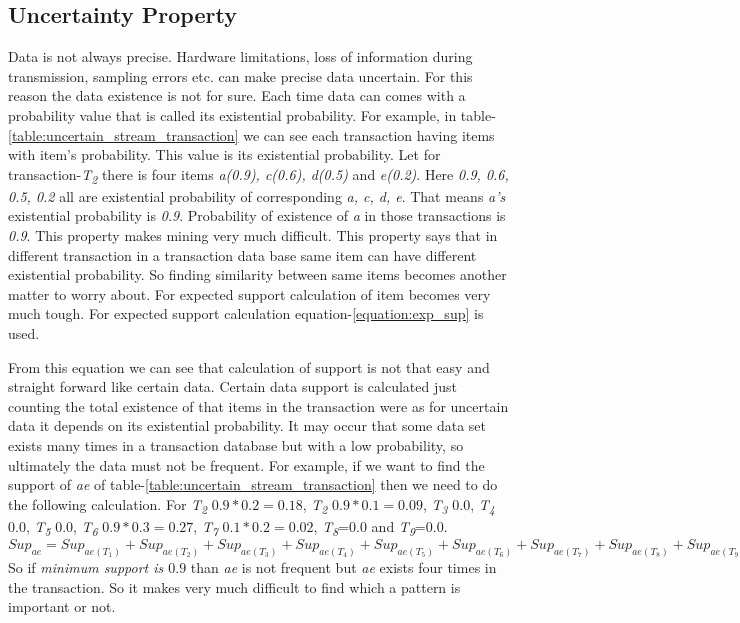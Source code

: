     \subsection{Uncertainty Property}
    Data is not always precise. Hardware limitations, loss of information during transmission, sampling errors etc. can make precise data uncertain. For this reason the data existence is not for sure. Each time data can comes with a probability value that is called its existential probability. For example, in table-\ref{table:uncertain_stream_transaction}  we can see each transaction having items with item's probability. This value is its existential probability. Let for transaction-\emph{T\textsubscript{2}} there is four items \emph{a(0.9), c(0.6), d(0.5)} and \emph{e(0.2)}. Here \emph{0.9, 0.6, 0.5, 0.2} all are existential probability of corresponding \emph{a, c, d, e}. That means \emph{a's} existential probability is \emph{0.9}. Probability of existence of \emph{a} in those transactions is \emph{0.9}. This property makes mining very much difficult. This property says that in different transaction in a transaction data base same item can have different existential probability. So finding similarity between same items becomes another matter to worry about. For expected support calculation of item becomes very much tough. For expected support calculation equation-\ref{equation:exp_sup} is used.
    
    From this equation we can see that calculation of support is not that easy and straight forward like certain data. Certain data support is calculated just counting the total existence of that items in the transaction were as for uncertain data it depends on its existential probability. It may occur that some data set exists many times in a transaction database but with a low probability, so ultimately the data must not be frequent. For example, if we want to find the support of \emph{ae} of table-\ref{table:uncertain_stream_transaction} then we need to do the following calculation. For \emph{T\textsubscript{2}} $0.9*0.2=0.18$, \emph{T\textsubscript{2}} $0.9*0.1=0.09$, \emph{T\textsubscript{3}} $0.0$, \emph{T\textsubscript{4}} $0.0$, \emph{T\textsubscript{5}} $0.0$, \emph{T\textsubscript{6}} $0.9*0.3=0.27$, \emph{T\textsubscript{7}} $0.1*0.2=0.02$, \emph{T\textsubscript{8}}=$0.0$ and \emph{T\textsubscript{9}}=$0.0$.$Sup_{ae} =Sup_{ae(T_1)}+Sup_{ae(T_2)}+Sup_{ae(T_3)}+Sup_{ae(T_4)}+Sup_{ae(T_5)}+Sup_{ae(T_6)}+Sup_{ae(T_7)}+Sup_{ae(T_8)}+Sup_{ae(T_9)}=0.18+0.09+0.0+0.0+0.0+0.27+0.0+0.02+0.0+0.0=0.54$ So if \emph{minimum support is $0.9$} than \emph{ae} is not frequent but \emph{ae} exists four times in the transaction. So it makes very much difficult to find which a pattern is important or not.
    
